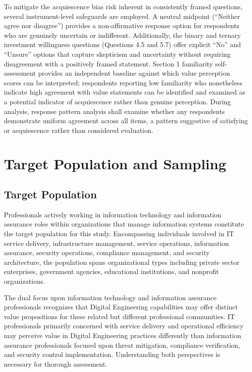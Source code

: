 To mitigate the acquiescence bias risk inherent in consistently framed questions, several instrument-level safeguards are employed. A neutral midpoint (``Neither agree nor disagree'') provides a non-affirmative response option for respondents who are genuinely uncertain or indifferent. Additionally, the binary and ternary investment willingness questions (Questions 4.5 and 5.7) offer explicit ``No'' and ``Unsure'' options that capture skepticism and uncertainty without requiring disagreement with a positively framed statement. Section 1 familiarity self-assessment provides an independent baseline against which value perception scores can be interpreted; respondents reporting low familiarity who nonetheless indicate high agreement with value statements can be identified and examined as a potential indicator of acquiescence rather than genuine perception. During analysis, response pattern analysis shall examine whether any respondents demonstrate uniform agreement across all items, a pattern suggestive of satisfying or acquiescence rather than considered evaluation.

\section{Target Population and Sampling}

\subsection{Target Population}

Professionals actively working in information technology and information assurance roles within organizations that manage information systems constitute the target population for this study. Encompassing individuals involved in IT service delivery, infrastructure management, service operations, information assurance, security operations, compliance management, and security architecture, the population spans organizational types including private sector enterprises, government agencies, educational institutions, and nonprofit organizations.

The dual focus upon information technology and information assurance professionals recognizes that Digital Engineering capabilities may offer distinct value propositions for these related but different professional communities. IT professionals primarily concerned with service delivery and operational efficiency may perceive value in Digital Engineering practices differently than information assurance professionals focused upon threat mitigation, compliance verification, and security control implementation. Understanding both perspectives is necessary for thorough assessment.

